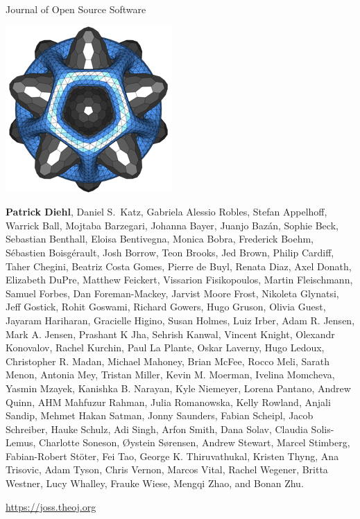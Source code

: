 \begin{frame}{Journal of Open Source Software}
\begin{center}
\includegraphics{joss.png}    
\end{center}

{\fontsize{4}{8}\selectfont
\textbf{Patrick Diehl}, Daniel S.~Katz, Gabriela Alessio Robles, Stefan Appelhoff, Warrick Ball,  Mojtaba Barzegari, Johanna Bayer,  Juanjo Bazán,  Sophie Beck,  Sebastian Benthall, Eloisa Bentivegna,  Monica Bobra,  Frederick Boehm, Sébastien Boisgérault, Josh Borrow, Teon Brooks, Jed Brown, Philip Cardiff, Taher Chegini,  Beatriz Costa Gomes, Pierre de Buyl, Renata Diaz,  Axel Donath, Elizabeth DuPre, Matthew Feickert, Vissarion Fisikopoulos, Martin Fleischmann, Samuel Forbes, Dan Foreman-Mackey, Jarvist Moore Frost, Nikoleta Glynatsi, Jeff Gostick, Rohit Goswami, Richard Gowers, Hugo Gruson, Olivia Guest, Jayaram Hariharan, Gracielle Higino, Susan Holmes, Luiz Irber, Adam R. Jensen, Mark A. Jensen, Prashant K Jha, Sehrish Kanwal, Vincent Knight, Olexandr Konovalov, Rachel Kurchin, Paul La Plante, Oskar Laverny, Hugo Ledoux, Christopher R. Madan, Michael Mahoney, Brian McFee, Rocco Meli, Sarath Menon, Antonia Mey, Tristan Miller, Kevin M. Moerman, Ivelina Momcheva, Yasmin Mzayek, Kanishka B. Narayan, Kyle Niemeyer, Lorena Pantano, Andrew Quinn, AHM Mahfuzur Rahman, Julia Romanowska, Kelly Rowland, Anjali Sandip, Mehmet Hakan Satman, Jonny Saunders, Fabian Scheipl, Jacob Schreiber, Hauke Schulz, Adi Singh, Arfon Smith, Dana Solav, Claudia Solis-Lemus, Charlotte Soneson, Øystein Sørensen, Andrew Stewart, Marcel Stimberg, Fabian-Robert Stöter, Fei Tao, George K. Thiruvathukal, Kristen Thyng, Ana Trisovic, Adam Tyson, Chris Vernon, Marcos Vital, Rachel Wegener, Britta Westner, Lucy Whalley, Frauke Wiese, Mengqi Zhao, and Bonan Zhu.}

\begin{center}
     \url{https://joss.theoj.org}
\end{center}

\end{frame}

